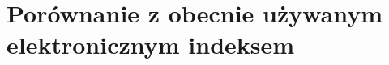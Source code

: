 \documentclass[brudnopis]{xmgr}
\begin{document}
\chapter{Porównanie z obecnie używanym elektronicznym indeksem}

\summary





\cite{MeteorDocs}
\cite{NodeDocs}
\cite{MongoDocs}
\cite{Mesosphere}
\cite{DiscoverMeteor2013}
\cite{ScalingMongoDB2011}
\cite{ScalingWithMongoDB}
\cite{Laika}
\cite{TinyTest}

%
%

\begin{bibdiv}
\begin{biblist}


\end{biblist}
\end{bibdiv}



\oswiadczenie
\end{document}
